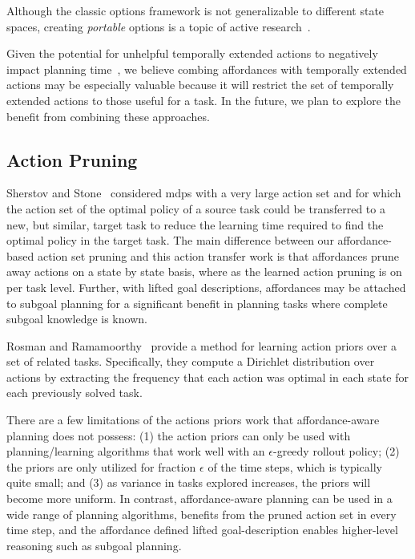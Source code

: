 \documentclass[letterpaper]{article}
\begin{document}
Although the classic options framework is not generalizable to different state spaces,
creating {\em portable} options is a topic of active research~\cite{konidaris07,konidaris2009efficient,Ravindran03analgebraic,croonenborghs2008learning,andre2002state,konidaris2012transfer}.

Given the potential for unhelpful temporally extended actions to negatively impact planning time~\cite{Jong:2008zr}, we believe combing affordances with temporally extended actions
may be especially valuable because it will restrict the set of temporally extended actions to those
useful for a task. In the future, we plan to explore the benefit from combining
these approaches.

\subsection{Action Pruning}

Sherstov and Stone~\cite{sherstov2005improving} considered \glspl{mdp} with a very large action set and for which the action
set of the optimal policy of a source task could be transferred to a new, but similar, target
task to reduce the learning time required to find the optimal policy in the target task. The main difference between our affordance-based action set pruning and this action transfer
work is that affordances prune away actions on a state by state basis, where
as the learned action pruning is on per task level. Further, with lifted goal descriptions, affordances may be attached to subgoal planning for a significant
benefit in planning tasks where complete subgoal knowledge is known.

Rosman and Ramamoorthy~\cite{rosman2012good} provide a method for learning action priors over a set of related tasks. Specifically, they compute a Dirichlet distribution over actions by extracting the frequency that each action was optimal in each state for each previously solved task.

There are a few limitations of the actions priors work that affordance-aware planning does not possess: (1) the action priors can only be used with planning/learning algorithms that work well with an $\epsilon$-greedy rollout policy; (2) the priors are only utilized for fraction $\epsilon$ of the time steps, which is typically quite small; and (3) as variance in tasks explored increases, the priors will become more uniform. In contrast, affordance-aware planning can be used in a wide range of planning algorithms, benefits from the pruned action set in every time step, and the affordance defined lifted goal-description enables higher-level reasoning such as subgoal planning.
\end{document}
